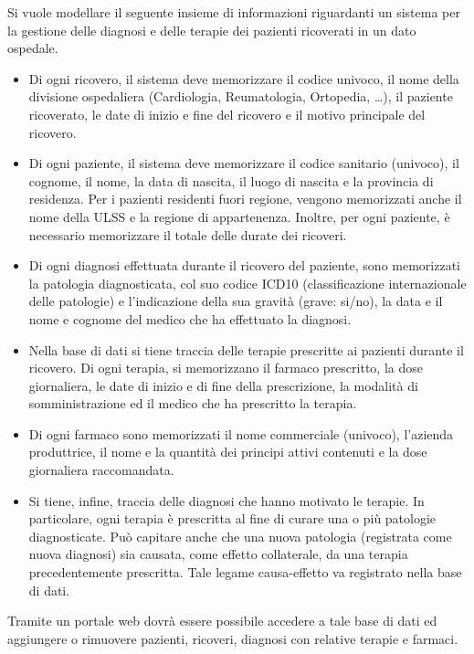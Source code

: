 \documentclass{article}
\begin{document}
Si vuole modellare il seguente insieme di informazioni riguardanti un sistema
per la gestione delle diagnosi e delle terapie dei pazienti ricoverati in un
dato ospedale.
\begin{itemize}
  \item Di ogni ricovero, il sistema deve memorizzare il codice univoco, il 
        nome della divisione ospedaliera (Cardiologia, Reumatologia, Ortopedia,
        \dots ), il paziente ricoverato, le date di inizio e fine del ricovero 
        e il motivo principale del ricovero.

  \item Di ogni paziente, il sistema deve memorizzare il codice sanitario 
        (univoco), il cognome, il nome, la data di nascita, il luogo di nascita 
        e la provincia di residenza. Per i pazienti residenti fuori regione, 
        vengono memorizzati anche il nome della ULSS e la regione di appartenenza.
        Inoltre, per ogni paziente, è necessario memorizzare il totale delle
        durate dei ricoveri.

  \item Di ogni diagnosi effettuata durante il ricovero del paziente, sono 
        memorizzati la patologia diagnosticata, col suo codice ICD10 
        (classificazione internazionale delle patologie) e l’indicazione della
        sua gravità (grave: si/no), la data e il nome e cognome del medico che 
        ha effettuato la diagnosi.

  \item Nella base di dati si tiene traccia delle terapie prescritte ai pazienti
        durante il ricovero. Di ogni terapia, si memorizzano il farmaco prescritto,
        la dose giornaliera, le date di inizio e di fine della prescrizione, la 
        modalità di somministrazione ed il medico che ha prescritto la terapia.

  \item Di ogni farmaco sono memorizzati il nome commerciale (univoco), l’azienda
        produttrice, il nome e la quantità dei principi attivi contenuti e la 
        dose giornaliera raccomandata.

  \item Si tiene, infine, traccia delle diagnosi che hanno motivato le terapie.
        In particolare, ogni terapia è prescritta al fine di curare una o più 
        patologie diagnosticate. Può capitare anche che una nuova patologia 
        (registrata come nuova diagnosi) sia causata, come effetto collaterale, 
        da una terapia precedentemente prescritta. Tale legame causa-effetto va
        registrato nella base di dati.
\end{itemize}
Tramite un portale web dovrà essere possibile accedere a tale base di dati ed
aggiungere o rimuovere pazienti, ricoveri, diagnosi con relative terapie e farmaci.
\end{document}
